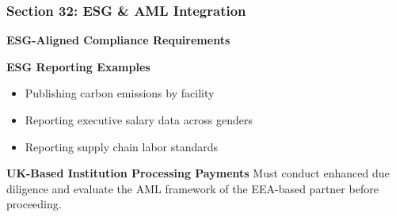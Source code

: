 \documentclass[12pt,aspectratio=169]{beamer}
\renewcommand{\scriptsize}{\fontsize{5}{6}\selectfont}
\begin{document}
	\begin{frame}
		\frametitle{\fontsize{13}{15}\selectfont \textbf{Section 32: ESG \& AML Integration}}
		\vspace{0.3cm}
		\begin{center}
			{\fontsize{12}{14}\selectfont \textbf{ESG-Aligned Compliance Requirements}}
		\end{center}
		\vspace{0.1cm}
		\begin{block}{\textbf{ESG Reporting Examples}}
			\scriptsize
			\begin{itemize}
				\item Publishing carbon emissions by facility
				\item Reporting executive salary data across genders
				\item Reporting supply chain labor standards
			\end{itemize}
		\end{block}
		\begin{block}{\textbf{UK-Based Institution Processing Payments}}
			\scriptsize
			Must conduct enhanced due diligence and evaluate the AML framework of the EEA-based partner before proceeding.
		\end{block}
	\end{frame}
	
\end{document}
